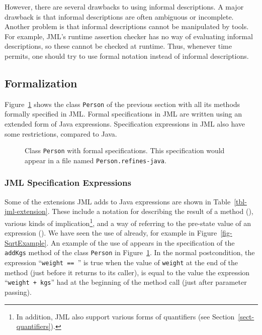 \documentclass{jotarticle}
\begin{document}
However, there are several drawbacks to using informal descriptions.
A major drawback is that informal descriptions are often ambiguous or
incomplete.  Another problem is that informal descriptions cannot be
manipulated by tools.  For example, JML's runtime assertion checker
has no way of evaluating informal descriptions, so these cannot be
checked at runtime.  Thus, whenever time permits, one should try to
use formal notation instead of informal descriptions.

\subsection{Formalization}
\label{sect-formalization}

Figure~\ref{fig-formal-spec} shows the class \texttt{Person} of the
previous section with all its methods formally specified in JML.
Formal specifications in JML are written using an extended form of
Java expressions.  Specification expressions in JML also have some
restrictions, compared to Java.

\begin{figure}

\caption{Class \texttt{Person} with formal specifications.  This
  specification would appear in a file named \texttt{Person.refines-java}.}
\label{fig-formal-spec}
\end{figure}

\subsubsection{JML Specification Expressions}

Some of the extensions JML adds to Java expressions
are shown in Table~\ref{tbl-jml-extension}.
These include a notation for describing the result of a method
(\RESULT), various kinds of implication\footnote{In addition, JML
also support various forms of quantifiers
(see Section~\ref{sect-quantifiers}).},
and a way of referring to the pre-state value of an expression
(\OLD{$\cdot$}).
We have seen the use of {\RESULT} already, for example in
Figure~\ref{fig-SqrtExample}.
An example of the use of \OLD{$\cdot$} appears in the specification of
the \texttt{addKgs} method of the class \texttt{Person} in
Figure~\ref{fig-formal-spec}.  In the normal postcondition,
the expression 
``\texttt{weight == }''
is true when the value of \texttt{weight} at the end of the method
(just before it returns to its caller), is equal to the value the expression
``\texttt{weight + kgs}'' had at the beginning of the method call
(just after parameter passing).
\end{document}
